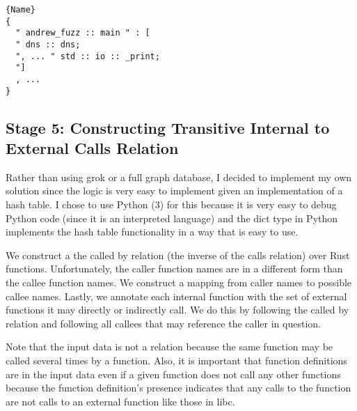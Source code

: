 \documentclass[11pt]{article}
\begin{document}
\begin{lstlisting}[caption=JSON, label=code:json]{Name}
{
  " andrew_fuzz :: main " : [
  " dns :: dns;
  ", ... " std :: io :: _print;
  "]
  , ...
}
\end{lstlisting}

\subsection{Stage 5: Constructing Transitive Internal to External Calls Relation}

Rather than using grok or a full graph database, I decided to implement my own solution since the logic is very easy to implement given an implementation of a hash table.
I chose to use Python (3) for this because it is very easy to debug Python code (since it is an interpreted language) and the dict type in Python implements the hash table functionality in a way that is easy to use.

We construct a the called by relation (the inverse of the calls relation) over Rust functions.
Unfortunately, the caller function names are in a different form than the callee function names.
We construct a mapping from caller names to possible callee names.
Lastly, we annotate each internal function with the set of external functions it may directly or indirectly call.
We do this by following the called by relation and following all callees that may reference the caller in question.

Note that the input data is not a relation because the same function may be called several times by a function.
Also, it is important that function definitions are in the input data even if a given function does not call any other functions because the function definition's presence indicates that any calls to the function are not calls to an external function like those in libc.


\end{document}
